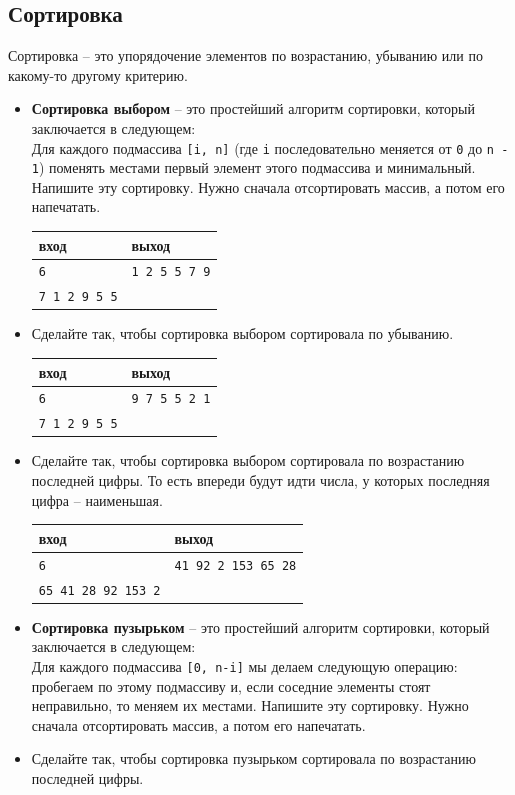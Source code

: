 \documentclass{article}
\begin{document}
\subsection*{Сортировка}
Сортировка -- это упорядочение элементов по возрастанию, убыванию или по какому-то другому критерию.
\begin{itemize}
\item \textbf{Сортировка выбором} -- это простейший алгоритм сортировки, который заключается в следующем: \\
Для каждого подмассива \texttt{[i, n]} (где \texttt{i} последовательно меняется от \texttt{0} до \texttt{n - 1}) поменять местами первый элемент этого подмассива и минимальный. Напишите эту сортировку. Нужно сначала отсортировать массив, а потом его напечатать.
\begin{center}
\begin{tabular}{ l | l }
 вход & выход \\ \hline
 \texttt{6} & \texttt{1 2 5 5 7 9}  \\ 
 \texttt{7 1 2 9 5 5} &   \\ 
\end{tabular}
\end{center}

\item Сделайте так, чтобы сортировка выбором сортировала по убыванию.
\begin{center}
\begin{tabular}{ l | l }
 вход & выход \\ \hline
 \texttt{6} & \texttt{9 7 5 5 2 1}  \\ 
 \texttt{7 1 2 9 5 5} &   \\ 
\end{tabular}
\end{center}

\item Сделайте так, чтобы сортировка выбором сортировала по возрастанию последней цифры. То есть впереди будут идти числа, у которых последняя цифра -- наименьшая.
\begin{center}
\begin{tabular}{ l | l }
 вход & выход \\ \hline
 \texttt{6} & \texttt{41 92 2 153 65 28}  \\ 
 \texttt{65 41 28 92 153 2} &   \\ 
\end{tabular}
\end{center}

\item \textbf{Сортировка пузырьком} -- это простейший алгоритм сортировки, который заключается в следующем: \\
Для каждого подмассива \texttt{[0, n-i]} мы делаем следующую операцию: пробегаем по этому подмассиву и, если соседние элементы стоят неправильно, то меняем их местами. Напишите эту сортировку. Нужно сначала отсортировать массив, а потом его напечатать.

\item Сделайте так, чтобы сортировка пузырьком сортировала по возрастанию последней цифры.
\end{itemize}
\end{document}
